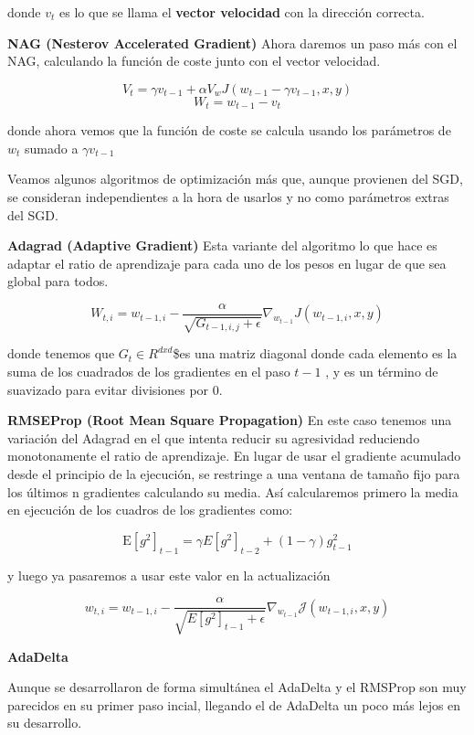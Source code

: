 \documentclass[
  a4paper,
  DIV=11,
  numbers=noendperiod]{scrreprt}
\begin{document}
donde \(v_t\) es lo que se llama el \textbf{vector velocidad} con la
dirección correcta.

\textbf{NAG (Nesterov Accelerated Gradient)} Ahora daremos un paso más
con el NAG, calculando la función de coste junto con el vector
velocidad.

\[ V_ {t}  =  \gamma   v_ {t-1}  +  \alpha   V_ {w}  J(  w_ {t-1}  -  \gamma   v_ {t-1}  ,x,y) \]
\[ W_ {t}  =  w_ {t-1}  -  v_ {t}  \]

donde ahora vemos que la función de coste se calcula usando los
parámetros de \(w_t\) sumado a \(\gamma   v_ {t-1}\)

Veamos algunos algoritmos de optimización más que, aunque provienen del
SGD, se consideran independientes a la hora de usarlos y no como
parámetros extras del SGD.

\textbf{Adagrad (Adaptive Gradient)} Esta variante del algoritmo lo que
hace es adaptar el ratio de aprendizaje para cada uno de los pesos en
lugar de que sea global para todos.

\[ W_ {t,i}  =  w_ {t-1,i}  -  \frac {\alpha }{\sqrt {G_ {t-1,i,j}+\epsilon }}   \nabla_ {w_{t-1}}  J(  w_ {t-1,i} ,x,y) \]

donde tenemos que \(G_t \in R^{dxd}\)\$es una matriz diagonal donde cada
elemento es la suma de los cuadrados de los gradientes en el paso
\(t-1\) , y es un término de suavizado para evitar divisiones por 0.

\textbf{RMSEProp (Root Mean Square Propagation)} En este caso tenemos
una variación del Adagrad en el que intenta reducir su agresividad
reduciendo monotonamente el ratio de aprendizaje. En lugar de usar el
gradiente acumulado desde el principio de la ejecución, se restringe a
una ventana de tamaño fijo para los últimos n gradientes calculando su
media. Así calcularemos primero la media en ejecución de los cuadros de
los gradientes como:

\[
\mathrm{E}\left[g^2\right]_{t-1}=\gamma E\left[g^2\right]_{t-2}+(1-\gamma) g_{t-1}^2
\]

y luego ya pasaremos a usar este valor en la actualización

\[
w_{t, i}=w_{t-1, i}-\frac{\alpha}{\sqrt{E\left[ g^2\right]_{t-1}+\epsilon}} \nabla_{w_{t-1}} \mathcal{J}\left(w_{t-1, i}, x, y\right)
\]

\textbf{AdaDelta}

Aunque se desarrollaron de forma simultánea el AdaDelta y el RMSProp son
muy parecidos en su primer paso incial, llegando el de AdaDelta un poco
más lejos en su desarrollo.
\end{document}
